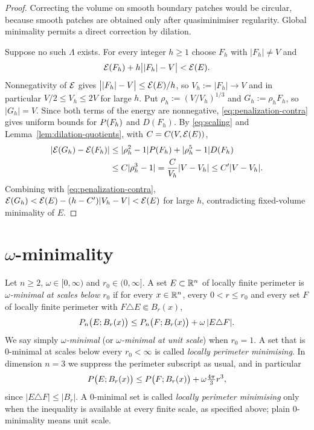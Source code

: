 \begin{proof}
Correcting the volume on smooth boundary patches would be circular, because
smooth patches are obtained only after quasiminimiser regularity.  Global
minimality permits a direct correction by dilation.

Suppose no such $\Lambda$ exists.  For every integer $h\ge1$ choose $F_h$ with
$|F_h|\ne V$ and
\begin{equation}\label{eq:penalization-contra}
  \mathcal E(F_h)+h\bigl||F_h|-V\bigr|<\mathcal E(E).
\end{equation}
Nonnegativity of $\mathcal E$ gives $\bigl||F_h|-V\bigr|\le\mathcal E(E)/h$, so
$V_h:=|F_h|\to V$ and in particular $V/2\le V_h\le2V$ for large $h$.  Put
$\rho_h:=(V/V_h)^{1/3}$ and $G_h:=\rho_hF_h$, so $|G_h|=V$.  Since both terms
of the energy are nonnegative, \eqref{eq:penalization-contra} gives uniform
bounds for $P(F_h)$ and $D(F_h)$.  By \eqref{eq:scaling} and
Lemma~\ref{lem:dilation-quotients}, with $C=C(V,\mathcal E(E))$,
\[
\begin{aligned}
  |\mathcal E(G_h)-\mathcal E(F_h)|
  &\le|\rho_h^2-1|P(F_h)+|\rho_h^5-1|D(F_h)\\
  &\le C|\rho_h^3-1|=\frac C{V_h}|V-V_h|\le C'|V-V_h| .
\end{aligned}
\]
Combining with \eqref{eq:penalization-contra},
$\mathcal E(G_h)<\mathcal E(E)-(h-C')|V_h-V|<\mathcal E(E)$ for large $h$, contradicting
fixed-volume minimality of $E$.
\end{proof}

\section{$\omega$-minimality}

\begin{definition}\label{def:omega-minimal}
Let $n\ge2$, $\omega\in[0,\infty)$ and $r_0\in(0,\infty]$.  A set
$E\subset\mathbb R^n$ of locally finite perimeter is \emph{$\omega$-minimal at
scales below $r_0$} if for every $x\in\mathbb R^n$, every $0<r\le r_0$ and
every set $F$ of locally finite perimeter with
$F\triangle E\Subset B_r(x)$,
\begin{equation}\label{eq:omega-minimal}
  P_n\bigl(E;B_r(x)\bigr)
  \le P_n\bigl(F;B_r(x)\bigr)+\omega\,|E\triangle F| .
\end{equation}
We say simply \emph{$\omega$-minimal} (or \emph{$\omega$-minimal at unit
scale}) when $r_0=1$.  A set that is $0$-minimal at scales below every
$r_0<\infty$ is called \emph{locally perimeter minimising}.  In dimension
$n=3$ we suppress the perimeter subscript as usual, and in particular
\begin{equation}\label{eq:omega-minimal-cube}
  P\bigl(E;B_r(x)\bigr)
  \le P\bigl(F;B_r(x)\bigr)+\omega\tfrac{4\pi}3r^3 ,
\end{equation}
since $|E\triangle F|\le|B_r|$.  A $0$-minimal set is called
\emph{locally perimeter minimising} only when the inequality is available at
every finite scale, as specified above; plain $0$-minimality means unit scale.
\end{definition}


